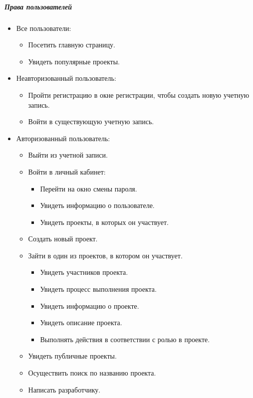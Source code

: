 \documentclass[a4paper,12pt]{article}
\begin{document}
\subparagraph{Права пользователей}
\begin{itemize}
\item Все пользователи:

\begin{itemize}
\item Посетить главную страницу.
\item Увидеть популярные проекты.
\end{itemize}

\item Неавторизованный пользователь:

\begin{itemize}
\item Пройти регистрацию в окне регистрации, чтобы создать новую учетную запись.
\item Войти в существующую учетную запись.
\end{itemize}

\item Авторизованный пользователь:

\begin{itemize}
\item Выйти из учетной записи.
\item Войти в личный кабинет:
	\begin{itemize}
	\item Перейти на окно смены пароля.
	\item Увидеть информацию о пользователе.
	\item Увидеть проекты, в которых он участвует.
	\end{itemize}
\item Создать новый проект.
\item Зайти в один из проектов, в котором он участвует.
	\begin{itemize}
	\item Увидеть участников проекта.
	\item Увидеть процесс выполнения проекта.
	\item Увидеть информацию о проекте.
	\item Увидеть описание проекта.
	\item Выполнять действия в соответствии с ролью в проекте.
	\end{itemize}
\item Увидеть публичные проекты.
\item Осуществить поиск по названию проекта.
\item Написать разработчику.
\end{itemize}
\end{itemize}
\end{document}
